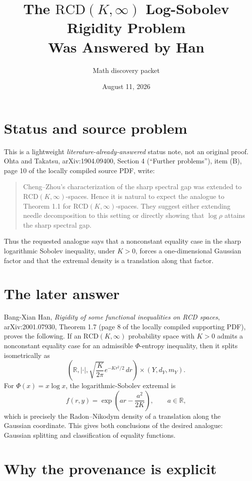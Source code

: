 \documentclass[11pt]{article}
\title{The $\mathrm{RCD}(K,\infty)$ Log-Sobolev Rigidity Problem\\
Was Answered by Han}
\author{Math discovery packet}
\date{August 11, 2026}
\begin{document}
\maketitle

\section*{Status and source problem}

This is a lightweight \emph{literature-already-answered} status note, not an
original proof.  Ohta and Takatsu, arXiv:1904.09400, Section 4 (``Further
problems''), item (B), page 10 of the locally compiled source PDF, write:
\begin{quote}
Cheng--Zhou's characterization of the sharp spectral gap was extended to
$\mathrm{RCD}(K,\infty)$-spaces.  Hence it is natural to expect the analogue
to Theorem 1.1 for $\mathrm{RCD}(K,\infty)$-spaces.  They suggest either
extending needle decomposition to this setting or directly showing that
$\log\rho$ attains the sharp spectral gap.
\end{quote}
Thus the requested analogue says that a nonconstant equality case in the
sharp logarithmic Sobolev inequality, under $K>0$, forces a one-dimensional
Gaussian factor and that the extremal density is a translation along that
factor.

\section*{The later answer}

Bang-Xian Han, \emph{Rigidity of some functional inequalities on RCD
spaces}, arXiv:2001.07930, Theorem 1.7 (page 8 of the locally compiled
supporting PDF), proves the following.  If an $\mathrm{RCD}(K,\infty)$
probability space with $K>0$ admits a nonconstant equality case for an
admissible $\Phi$-entropy inequality, then it splits isometrically as
\[
 \left(\mathbb R,|\cdot|,
 \sqrt{\frac{K}{2\pi}}e^{-Kr^2/2}\,dr\right)
 \times (Y,d_Y,m_Y).
\]
For $\Phi(x)=x\log x$, the logarithmic-Sobolev extremal is
\[
 f(r,y)=\exp\!\left(ar-\frac{a^2}{2K}\right),
 \qquad a\in\mathbb R,
\]
which is precisely the Radon--Nikodym density of a translation along the
Gaussian coordinate.  This gives both conclusions of the desired analogue:
Gaussian splitting and classification of equality functions.

\section*{Why the provenance is explicit}
\end{document}
